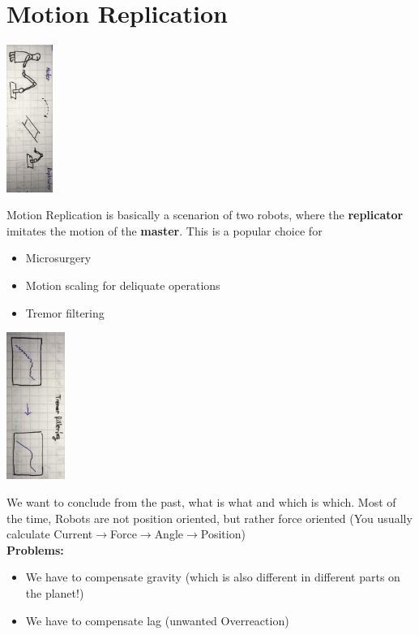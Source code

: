 \documentclass{exerciseBlue}
\begin{document}
\section{Motion Replication}\label{sec:motion}
\begin{center}
	\includegraphics[height = 4.8cm]{Images/Replication2}
\end{center}
Motion Replication is basically a scenarion of two robots, where the \textbf{replicator} imitates the motion of the \textbf{master}. This is a popular choice for\begin{itemize}
	\item Microsurgery
	\item Motion scaling for deliquate operations
	\item Tremor filtering
\end{itemize}
\begin{center}
	\includegraphics[height = 4.8cm]{Images/TremorFiltering}
\end{center}
We want to conclude from the past, what is what and which is which. Most of the time, Robots are not position oriented, but rather force oriented (You usually calculate Current$\rightarrow$Force$\rightarrow$Angle$\rightarrow$Position)\\
\textbf{Problems:}\begin{itemize}
	\item We have to compensate gravity (which is also different in different parts on the planet!)
	\item We have to compensate lag (unwanted Overreaction)
\end{itemize}
\end{document}

